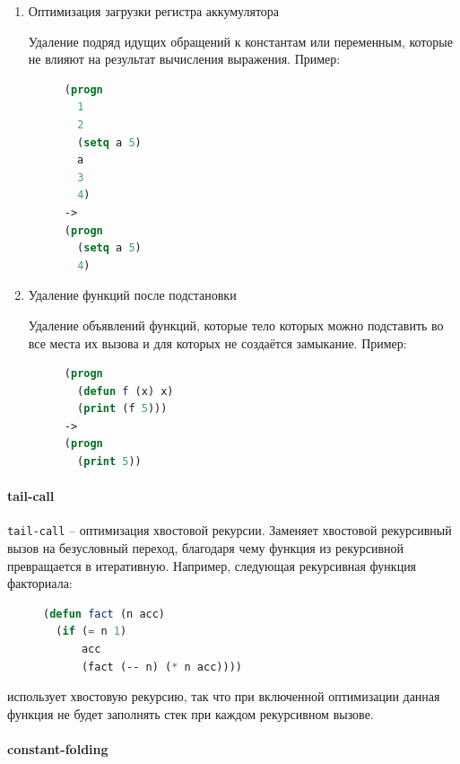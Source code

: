 \begin{enumerate}

\item Оптимизация загрузки регистра аккумулятора

Удаление подряд идущих обращений к константам или переменным, которые не влияют на результат вычисления выражения. Пример:
\begin{figure}[H]
\begin{lstlisting}[language=Lisp]
(progn
  1
  2
  (setq a 5)
  a
  3
  4)
->
(progn
  (setq a 5)
  4)
\end{lstlisting}
\end{figure}


\item Удаление функций после подстановки 

Удаление объявлений функций, которые тело которых можно подставить во все места их вызова и для которых не создаётся замыкание. Пример:
\begin{figure}[H]
\begin{lstlisting}[language=Lisp]
(progn
  (defun f (x) x)
  (print (f 5)))
->
(progn
  (print 5))
\end{lstlisting}
\end{figure}

\end{enumerate}


\paragraph{tail-call}

\texttt{tail-call} -- оптимизация хвостовой рекурсии. Заменяет хвостовой рекурсивный вызов на безусловный переход, благодаря чему функция из рекурсивной превращается в итеративную. Например, следующая рекурсивная функция факториала:

\begin{figure}[H]
\begin{lstlisting}[language=Lisp]
(defun fact (n acc)
  (if (= n 1)
      acc
      (fact (-- n) (* n acc))))
\end{lstlisting}
\end{figure}

использует хвостовую рекурсию, так что при включенной оптимизации данная функция не будет заполнять стек при каждом рекурсивном вызове.


\paragraph{constant-folding}

